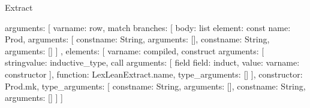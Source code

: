\begin{lexlean}{Extract}
\begin{toolingmodule}
{{{{{{{{{{{{{{{                                              arguments: [
                                                var{name: row},
                                                match{
                                                  branches: [
                                                    {
                                                      body: list{
                                                        element: const{
                                                          name: Prod,
                                                          arguments: [
                                                            const{name: String, arguments: []},
                                                            const{name: String, arguments: []}
                                                          ]
                                                        },
                                                        elements: [
                                                          var{name: compiled},
                                                          construct{
                                                            arguments: [
                                                              string{value: inductive_type},
                                                              call{
                                                                arguments: [
                                                                  field{
                                                                    field: induct,
                                                                    value: var{name: constructor}
                                                                  }
                                                                ],
                                                                function: LexLeanExtract.name,
                                                                type_arguments: []
                                                              }
                                                            ],
                                                            constructor: Prod.mk,
                                                            type_arguments: [
                                                              const{name: String, arguments: []},
                                                              const{name: String, arguments: []}
                                                            ]
                                                          }
                                                        ]
}}}}}}}}}}}}}}}}}}
\end{toolingmodule}
\end{lexlean}
